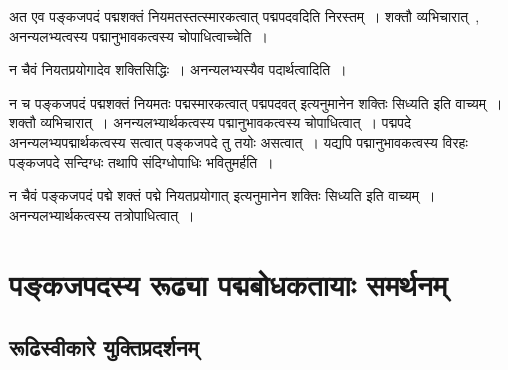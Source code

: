 				\begin{small}
				
					अत एव पङ्कजपदं पद्मशक्तं नियमतस्तत्स्मारकत्वात् पद्मपदवदिति निरस्तम्~। शक्तौ व्यभिचारात्~, अनन्यलभ्यत्वस्य पद्मानुभावकत्वस्य चोपाधित्वाच्चेति~। 
				
					न चैवं नियतप्रयोगादेव शक्तिसिद्धिः~। अनन्यलभ्यस्यैव पदार्थत्वादिति~।
				\end{small}
			
				न च पङ्कजपदं पद्मशक्तं नियमतः पद्मस्मारकत्वात् पद्मपदवत् इत्यनुमानेन शक्तिः सिध्यति इति वाच्यम्~।  शक्तौ व्यभिचारात्~।  अनन्यलभ्यार्थकत्वस्य  पद्मानुभावकत्वस्य चोपाधित्वात्~। पद्मपदे अनन्यलभ्यपद्मार्थकत्वस्य सत्वात् पङ्कजपदे तु तयोः असत्वात्~।  यद्यपि पद्मानुभावकत्वस्य विरहः पङ्कजपदे सन्दिग्धः तथापि संदिग्धोपाधिः भवितुमर्हति~। 	

				न चैवं पङ्कजपदं पद्मे शक्तं पद्मे नियतप्रयोगात् इत्यनुमानेन शक्तिः सिध्यति इति वाच्यम्~।  अनन्यलभ्यार्थकत्वस्य तत्रोपाधित्वात्~। 

	\section{पङ्कजपदस्य रूढ्या पद्मबोधकतायाः समर्थनम्}
		
		\subsection{रूढिस्वीकारे युक्तिप्रदर्शनम्} 

